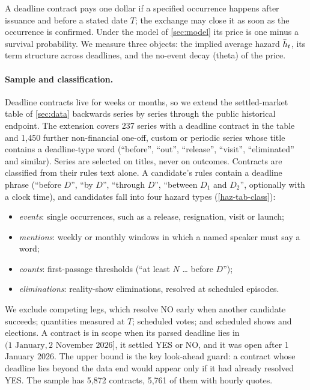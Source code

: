 
A deadline contract pays one dollar if a specified occurrence happens after issuance and before a
stated date $T$; the exchange may close it as soon as the occurrence is confirmed. Under the model of
\cref{sec:model} its price is one minus a survival probability. We measure three objects: the implied
average hazard $\bar h_t$, its term structure across deadlines, and the no-event decay (theta) of
the price.

\paragraph{Sample and classification.}
Deadline contracts live for weeks or months, so we extend the settled-market table of \cref{sec:data}
backwards series by series through the public historical endpoint. The extension covers 237 series
with a deadline contract in the table and 1{,}450 further non-financial one-off, custom or periodic
series whose title contains a deadline-type word (``before'', ``out'', ``release'', ``visit'',
``eliminated'' and similar). Series are selected on titles, never on outcomes.
Contracts are classified from their rules text alone. A candidate's rules contain a deadline phrase
(``before $D$'', ``by $D$'', ``through $D$'', ``between $D_1$ and $D_2$'', optionally with a clock
time), and candidates fall into four hazard types (\cref{haz-tab-class}):
\begin{itemize}
\item \emph{events}: single occurrences, such as a release, resignation, visit or launch;
\item \emph{mentions}: weekly or monthly windows in which a named speaker must say a word;
\item \emph{counts}: first-passage thresholds (``at least $N$ \dots{} before $D$'');
\item \emph{eliminations}: reality-show eliminations, resolved at scheduled episodes.
\end{itemize}
We exclude competing legs, which resolve NO early when another candidate succeeds; quantities
measured at $T$; scheduled votes; and scheduled shows and elections. A contract is in scope when its
parsed deadline lies in $(1\text{ January}, 2\text{ November }2026]$, it settled YES or NO, and it
was open after 1 January 2026. The upper bound is the key look-ahead guard: a contract whose deadline
lies beyond the data end would appear only if it had already resolved YES. The sample has 5{,}872
contracts, 5{,}761 of them with hourly quotes.

